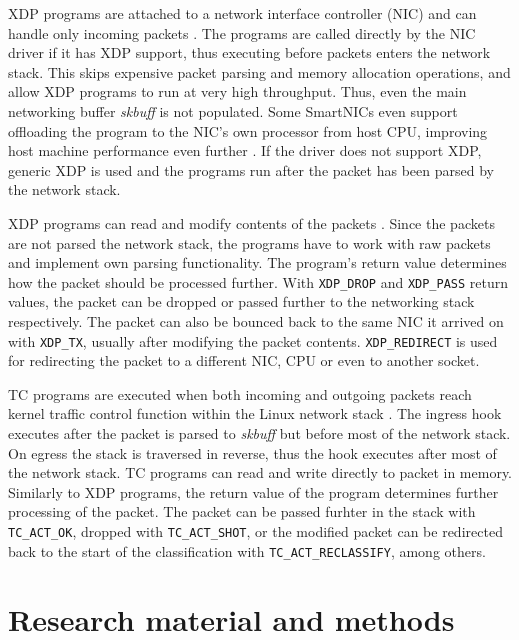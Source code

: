 \documentclass[english,12pt,a4paper,pdftex,sci,utf8]{aaltothesis}
\begin{document}
XDP programs are attached to a network interface controller (NIC) and can handle only incoming packets \cite{hoiland2018express}. The programs are called directly by the NIC driver if it has XDP support, thus executing before packets enters the network stack. This skips expensive packet parsing and memory allocation operations, and allow XDP programs to run at very high throughput. Thus, even the main networking buffer \textit{skbuff} is not populated. Some SmartNICs even support offloading the program to the NIC's own processor from host CPU, improving host machine performance even further \cite{cilium-program-types}. If the driver does not support XDP, generic XDP is used and the programs run after the packet has been parsed by the network stack.

XDP programs can read and modify contents of the packets \cite{vieira2020fast}. Since the packets are not parsed the network stack, the programs have to work with raw packets and implement own parsing functionality. The program's return value determines how the packet should be processed further. With \texttt{XDP\_DROP} and \texttt{XDP\_PASS} return values, the packet can be dropped or passed further to the networking stack respectively. The packet can also be bounced back to the same NIC it arrived on with \texttt{XDP\_TX}, usually after modifying the packet contents. \texttt{XDP\_REDIRECT} is used for redirecting the packet to a different NIC, CPU or even to another socket.

TC programs are executed when both incoming and outgoing packets reach kernel traffic control function within the Linux network stack \cite{vieira2020fast}. The ingress hook executes after the packet is parsed to \textit{skbuff} but before most of the network stack. On egress the stack is traversed in reverse, thus the hook executes after most of the network stack. TC programs can read and write directly to packet in memory. Similarly to XDP programs, the return value of the program determines further processing of the packet. The packet can be passed furhter in the stack with \texttt{TC\_ACT\_OK}, dropped with \texttt{TC\_ACT\_SHOT}, or the modified packet can be redirected back to the start of the classification with \texttt{TC\_ACT\_RECLASSIFY}, among others.

\clearpage

\section{Research material and methods} \label{section-methods}
\end{document}

